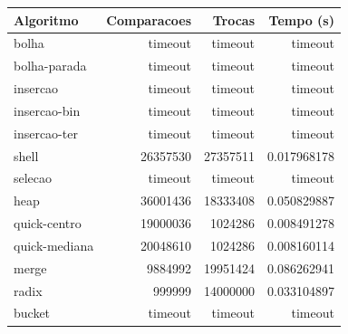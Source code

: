 \begin{tabular}{lrrr}
\hline
Algoritmo & Comparacoes & Trocas & Tempo (s) \\
\hline
bolha & timeout & timeout & timeout \\
bolha-parada & timeout & timeout & timeout \\
insercao & timeout & timeout & timeout \\
insercao-bin & timeout & timeout & timeout \\
insercao-ter & timeout & timeout & timeout \\
shell & 26357530 & 27357511 & 0.017968178 \\
selecao & timeout & timeout & timeout \\
heap & 36001436 & 18333408 & 0.050829887 \\
quick-centro & 19000036 & 1024286 & 0.008491278 \\
quick-mediana & 20048610 & 1024286 & 0.008160114 \\
merge & 9884992 & 19951424 & 0.086262941 \\
radix & 999999 & 14000000 & 0.033104897 \\
bucket & timeout & timeout & timeout \\
\hline
\end{tabular}

